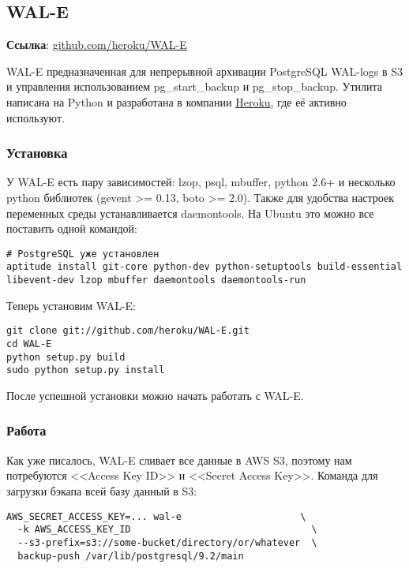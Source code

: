\subsection{WAL-E}
\textbf{Ссылка}: \href{https://github.com/heroku/WAL-E}{github.com/heroku/WAL-E}

WAL-E предназначенная для непрерывной архивации PostgreSQL WAL-logs в S3 и управления использованием pg\_start\_backup и pg\_stop\_backup. Утилита написана на Python и разработана в компании \href{http://www.heroku.com/}{Heroku}, где её активно используют. 

\subsubsection{Установка}

У WAL-E есть пару зависимостей: lzop, psql, mbuffer, python 2.6+ и несколько python библиотек (gevent >= 0.13, boto >= 2.0). Также для удобства настроек переменных среды устанавливается daemontools. На Ubuntu это можно все поставить одной командой:

\begin{lstlisting}[label=lst:wal-e1,caption=Установка зависимостей для WAL-E]
# PostgreSQL уже установлен
aptitude install git-core python-dev python-setuptools build-essential libevent-dev lzop mbuffer daemontools daemontools-run
\end{lstlisting}

Теперь установим WAL-E:

\begin{lstlisting}[label=lst:wal-e2,caption=Установка WAL-E]
git clone git://github.com/heroku/WAL-E.git
cd WAL-E
python setup.py build
sudo python setup.py install
\end{lstlisting}

После успешной установки можно начать работать с WAL-E. 

\subsubsection{Работа}
Как уже писалось, WAL-E сливает все данные в AWS S3, поэтому нам потребуются <<Access Key ID>> и <<Secret Access Key>>. Команда для загрузки бэкапа всей базу данный в S3:

\begin{lstlisting}[label=lst:wal-e3,caption=Загрузка бэкапа всей базы данных в S3]
AWS_SECRET_ACCESS_KEY=... wal-e                     \
  -k AWS_ACCESS_KEY_ID                                \
  --s3-prefix=s3://some-bucket/directory/or/whatever  \
  backup-push /var/lib/postgresql/9.2/main
\end{lstlisting}

